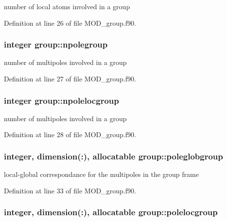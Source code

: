 number of local atoms involved in a group 



Definition at line 26 of file M\-O\-D\-\_\-group.\-f90.

\hypertarget{classgroup_ad4f3e6a29572d0b9a223c8b6e8822eb2}{
\subsubsection[{npolegroup}]{\setlength{\rightskip}{0pt plus 5cm}integer group\-::npolegroup}}\label{classgroup_ad4f3e6a29572d0b9a223c8b6e8822eb2}


number of multipoles involved in a group 



Definition at line 27 of file M\-O\-D\-\_\-group.\-f90.

\hypertarget{classgroup_a08c59b59b51a6eb8cd4256954b1a10e9}{
\subsubsection[{npolelocgroup}]{\setlength{\rightskip}{0pt plus 5cm}integer group\-::npolelocgroup}}\label{classgroup_a08c59b59b51a6eb8cd4256954b1a10e9}


number of multipoles involved in a group 



Definition at line 28 of file M\-O\-D\-\_\-group.\-f90.

\hypertarget{classgroup_aab1eab4d8d77b04b00795dbb570b15f0}{
\subsubsection[{poleglobgroup}]{\setlength{\rightskip}{0pt plus 5cm}integer, dimension(\-:), allocatable group\-::poleglobgroup}}\label{classgroup_aab1eab4d8d77b04b00795dbb570b15f0}


local-\/global correspondance for the multipoles in the group frame 



Definition at line 33 of file M\-O\-D\-\_\-group.\-f90.

\hypertarget{classgroup_a788c0d37b32a692a72d0fd139bf52427}{
\subsubsection[{polelocgroup}]{\setlength{\rightskip}{0pt plus 5cm}integer, dimension(\-:), allocatable group\-::polelocgroup}}\label{classgroup_a788c0d37b32a692a72d0fd139bf52427}



